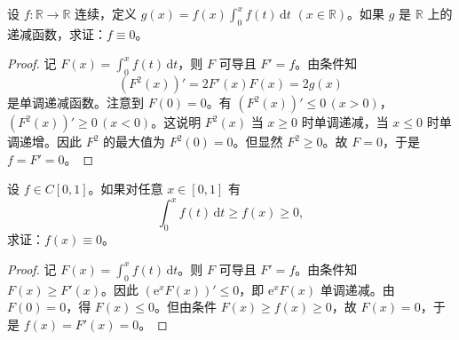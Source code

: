 \documentclass[../../main.tex]{subfiles}%
\begin{document}
\begin{example}
设 \( f : \mathbb{R} \to \mathbb{R} \) 连续，定义 \( g(x) = f(x)\int_{0}^{x} f(t) \, \mathrm{d}t \) \((x \in \mathbb{R})\)。如果 \( g \) 是 \( \mathbb{R} \) 上的递减函数，求证：\( f \equiv 0 \)。
\end{example}
\begin{proof}
记 \( F(x) = \int_{0}^{x} f(t) \, \mathrm{d}t \)，则 \( F \) 可导且 \( F' = f \)。由条件知
\[
(F^2(x))' = 2F'(x)F(x) = 2g(x)
\]
是单调递减函数。注意到 \( F(0) = 0 \)。有 \( (F^2(x))' \leqslant 0 \, (x > 0) \)，\( (F^2(x))' \geqslant 0 \, (x < 0) \)。这说明 \( F^2(x) \) 当 \( x \geqslant 0 \) 时单调递减，当 \( x \leqslant 0 \) 时单调递增。因此 \( F^2 \) 的最大值为 \( F^2(0) = 0 \)。但显然 \( F^2 \geqslant 0 \)。故 \( F = 0 \)，于是 \( f =F'= 0 \)。
\end{proof}

\begin{example}
设 \( f \in C[0,1] \)。如果对任意 \( x \in [0,1] \) 有
\[
\int_{0}^{x} f(t) \, \mathrm{d}t \geqslant f(x) \geqslant 0,
\]
求证：\( f(x) \equiv 0 \)。
\end{example}
\begin{proof}
记 \( F(x) = \int_{0}^{x} f(t) \, \mathrm{d}t \)。则 \( F \) 可导且 \( F' = f \)。由条件知 \( F(x) \geqslant F'(x) \)。因此 \( (\mathrm{e}^x F(x))' \leqslant 0 \)，即 \( \mathrm{e}^x F(x) \) 单调递减。由 \( F(0) = 0 \)，得 \( F(x) \leqslant 0 \)。但由条件 \( F(x) \geqslant f(x) \geqslant 0 \)，故 \( F(x) = 0 \)，于是 \( f(x) =F'(x)= 0 \)。
\end{proof}
\end{document}
